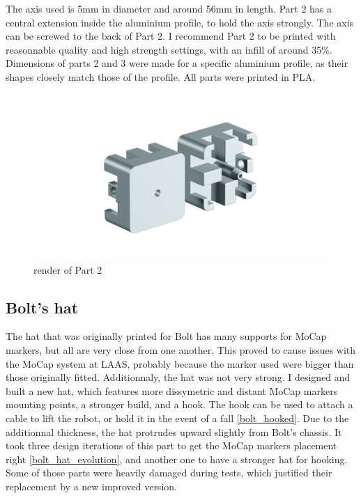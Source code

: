 \documentclass[a4paper,10pt]{article}
\begin{document}
The axis used is 5mm in diameter and around 56mm in length. Part 2 has a central extension inside the aluminium profile, to hold the axis strongly. The axis can be screwed to the back of Part 2. I recommend Part 2 to be printed with reasonnable quality and high strength settings, with an infill of around 35\%. Dimensions of parts 2 and 3 were made for a specific aluminium profile, as their shapes closely match those of the profile. All parts were printed in PLA.

\begin{figure}[H]
\label{fig:new_bolt_stand_part2}
\centering
  \includegraphics[width=\linewidth, angle=0, scale=0.8]{./images/render_stand.png}
  \caption{render of Part 2}
\end{figure}




\subsection{Bolt's hat}
The hat that was originally printed for Bolt has many supports for MoCap markers, but all are very close from one another. This proved to cause issues with the MoCap system at LAAS, probably because the marker used were bigger than those originally fitted. Additionnaly, the hat was not very strong. I designed and built a new hat, which features more dissymetric and distant MoCap markers mounting points, a stronger build, and a hook. The hook can be used to attach a cable to lift the robot, or hold it in the event of a fall \ref{bolt_hooked}. Due to the additionnal thickness, the hat protrudes upward slightly from Bolt's chassis. It took three design iterations of this part to get the MoCap markers placement right \ref{bolt_hat_evolution}, and another one to have a stronger hat for hooking. Some of those parts were heavily damaged during tests, which justified their replacement by a new improved version.
\end{document}
